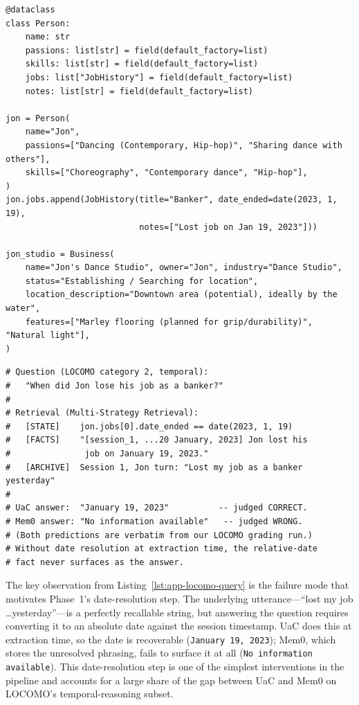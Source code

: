 \vspace{-0.5em}
\begin{lstlisting}[caption={Phase~2 output -- typed Python state for \texttt{conv-30}, a \emph{verbatim} excerpt of the 7\,KB \texttt{state.py} the pipeline regenerated from the full fact corpus. The model invented the \texttt{Person}/\texttt{JobHistory}/\texttt{Business} schema itself; \texttt{jon}'s long \texttt{notes} list and Gina's parallel objects are omitted for space.},label={lst:app-locomo-state}]
@dataclass
class Person:
    name: str
    passions: list[str] = field(default_factory=list)
    skills: list[str] = field(default_factory=list)
    jobs: list["JobHistory"] = field(default_factory=list)
    notes: list[str] = field(default_factory=list)

jon = Person(
    name="Jon",
    passions=["Dancing (Contemporary, Hip-hop)", "Sharing dance with others"],
    skills=["Choreography", "Contemporary dance", "Hip-hop"],
)
jon.jobs.append(JobHistory(title="Banker", date_ended=date(2023, 1, 19),
                           notes=["Lost job on Jan 19, 2023"]))

jon_studio = Business(
    name="Jon's Dance Studio", owner="Jon", industry="Dance Studio",
    status="Establishing / Searching for location",
    location_description="Downtown area (potential), ideally by the water",
    features=["Marley flooring (planned for grip/durability)", "Natural light"],
)
\end{lstlisting}
\vspace{-0.5em}
\begin{lstlisting}[caption={A real LOCOMO QA against this state. The judge accepts both ``19 January, 2023'' and the typed form below as correct.},label={lst:app-locomo-query}]
# Question (LOCOMO category 2, temporal):
#   "When did Jon lose his job as a banker?"
#
# Retrieval (Multi-Strategy Retrieval):
#   [STATE]    jon.jobs[0].date_ended == date(2023, 1, 19)
#   [FACTS]    "[session_1, ...20 January, 2023] Jon lost his
#               job on January 19, 2023."
#   [ARCHIVE]  Session 1, Jon turn: "Lost my job as a banker yesterday"
#
# UaC answer:  "January 19, 2023"          -- judged CORRECT.
# Mem0 answer: "No information available"   -- judged WRONG.
# (Both predictions are verbatim from our LOCOMO grading run.)
# Without date resolution at extraction time, the relative-date
# fact never surfaces as the answer.
\end{lstlisting}

The key observation from Listing~\ref{lst:app-locomo-query} is the failure mode that motivates Phase~1's date-resolution step. The underlying utterance---``lost my job \dots yesterday''---is a perfectly recallable string, but answering the question requires converting it to an absolute date against the session timestamp. UaC does this at extraction time, so the date is recoverable (\texttt{January 19, 2023}); Mem0, which stores the unresolved phrasing, fails to surface it at all (\texttt{No information available}). This date-resolution step is one of the simplest interventions in the pipeline and accounts for a large share of the gap between UaC and Mem0 on LOCOMO's temporal-reasoning subset.

